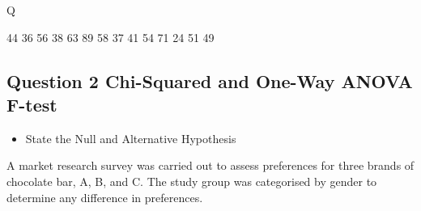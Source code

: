 \documentclass[a4paper,12pt]{article}
\begin{document}
\newpage

Q

44 36 56 38 63 89 58 37 41 54 71 24 51 49

	\newpage
\subsection*{Question 2 Chi-Squared and One-Way ANOVA F-test}

\begin{itemize}
	\item State the Null and Alternative Hypothesis
\end{itemize}



A market research survey was carried out to assess preferences for three brands of chocolate bar, A, B, and C. 
The study group was categorised by gender to determine any difference in preferences.
\end{document}
